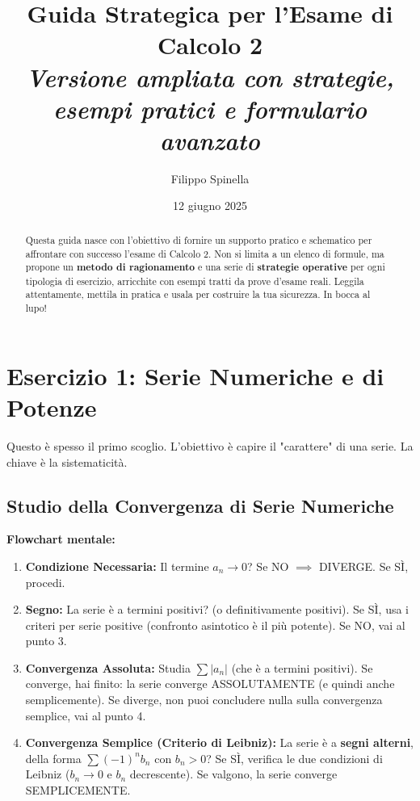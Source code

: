 \documentclass[a4paper, 12pt]{article}
\title{
    \Huge Guida Strategica per l'Esame di Calcolo 2 \\
    \large \textit{Versione ampliata con strategie, esempi pratici e formulario avanzato}
}
\author{Filippo Spinella}
\date{12 giugno 2025}
\begin{document}
\maketitle
\thispagestyle{empty}
\newpage

\begin{abstract}
\noindent Questa guida nasce con l'obiettivo di fornire un supporto pratico e schematico per affrontare con successo l'esame di Calcolo 2. Non si limita a un elenco di formule, ma propone un \textbf{metodo di ragionamento} e una serie di \textbf{strategie operative} per ogni tipologia di esercizio, arricchite con esempi tratti da prove d'esame reali. Leggila attentamente, mettila in pratica e usala per costruire la tua sicurezza. In bocca al lupo!
\end{abstract}

\tableofcontents
\newpage

\section{Esercizio 1: Serie Numeriche e di Potenze}
Questo è spesso il primo scoglio. L'obiettivo è capire il "carattere" di una serie. La chiave è la sistematicità.

\subsection{Studio della Convergenza di Serie Numeriche}
\begin{strategia}
\textbf{Flowchart mentale:}
\begin{enumerate}
    \item \textbf{Condizione Necessaria:} Il termine $a_n \to 0$? Se NO $\implies$ DIVERGE. Se SÌ, procedi. 
    \item \textbf{Segno:} La serie è a termini positivi? (o definitivamente positivi). Se SÌ, usa i criteri per serie positive (confronto asintotico è il più potente). Se NO, vai al punto 3. 
    \item \textbf{Convergenza Assoluta:} Studia $\sum |a_n|$ (che è a termini positivi). Se converge, hai finito: la serie converge ASSOLUTAMENTE (e quindi anche semplicemente). Se diverge, non puoi concludere nulla sulla convergenza semplice, vai al punto 4. 
    \item \textbf{Convergenza Semplice (Criterio di Leibniz):} La serie è a \textbf{segni alterni}, della forma $\sum (-1)^n b_n$ con $b_n>0$? Se SÌ, verifica le due condizioni di Leibniz ($b_n \to 0$ e $b_n$ decrescente). Se valgono, la serie converge SEMPLICEMENTE. 
\end{enumerate}
\end{strategia}
\end{document}
